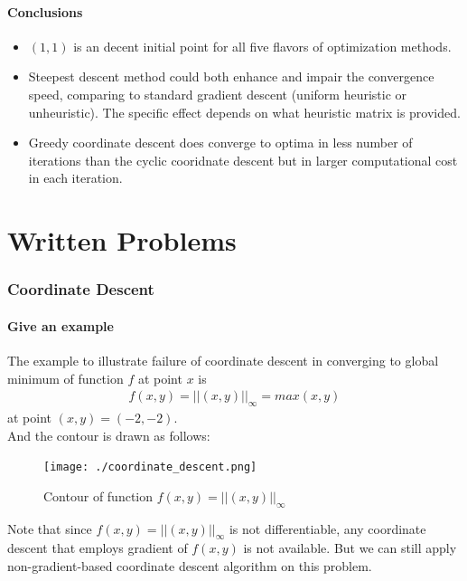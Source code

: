 \documentclass[11pt,a4paper]{article}
\begin{document}
\newpage
\subsection{Conclusions}
\begin{itemize}
    \item $(1, 1)$ is an decent initial point for all five
        flavors of optimization methods.
    \item Steepest descent method could both enhance and impair the convergence
        speed, comparing to standard gradient descent (uniform heuristic or
        unheuristic). The specific effect depends on what heuristic matrix is provided. 
    \item Greedy coordinate descent does converge to optima in less number of
        iterations than the cyclic cooridnate descent but in larger
        computational cost in each iteration.
\end{itemize}

\newpage
\part{Written Problems}
\setcounter{section}{0}
\renewcommand{\thesubsection}{(\alph{subsection})}
\section{Coordinate Descent}
\subsection{Give an example}
The example to illustrate failure of coordinate descent in converging to
global minimum of function $f$ at point $x$ is
\begin{align}
    f(x,y) = || (x,y) ||_{\infty} = max (x, y)
\end{align}
at point $(x,y) = (-2, -2)$. \\
And the contour is drawn as follows:
\begin{figure}[h]
    \centering
    \texttt{[image: ./coordinate\_descent.png]}
    \caption{Contour of function $f(x,y) = || (x,y) ||_{\infty}$}
\end{figure}

\noindent
Note that since $f(x,y) = || (x,y) ||_{\infty}$ is not differentiable, any
coordinate descent that employs gradient of $f(x,y)$ is not available. But we
can still apply non-gradient-based coordinate descent algorithm on this
problem. 
\end{document}
